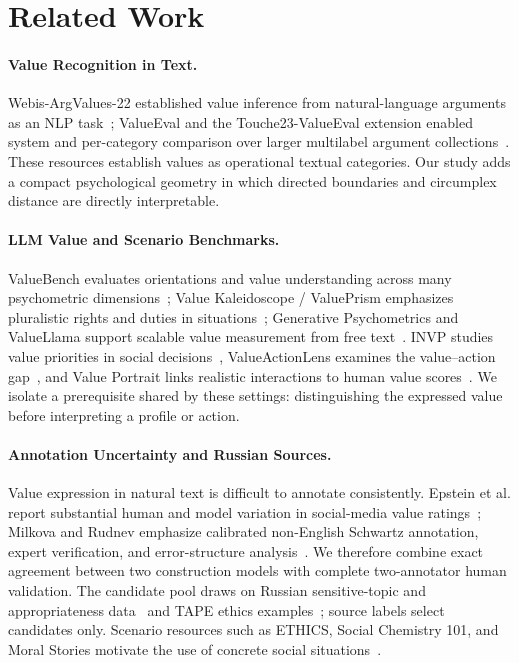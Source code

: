 \documentclass[runningheads,a4paper]{llncs}
\begin{document}
\section{Related Work}

\paragraph{Value Recognition in Text.}
Webis-ArgValues-22 established value inference from natural-language arguments as an NLP task~\cite{kiesel2022identifying}; ValueEval and the Touche23-ValueEval extension enabled system and per-category comparison over larger multilabel argument collections~\cite{kiesel2023semeval,mirzakhmedova2024touche}. These resources establish values as operational textual categories. Our study adds a compact psychological geometry in which directed boundaries and circumplex distance are directly interpretable.

\paragraph{LLM Value and Scenario Benchmarks.}
ValueBench evaluates orientations and value understanding across many psychometric dimensions~\cite{ren2024valuebench}; Value Kaleidoscope / ValuePrism emphasizes pluralistic rights and duties in situations~\cite{sorensen2024value}; Generative Psychometrics and ValueLlama support scalable value measurement from free text~\cite{ye2025measuring}. INVP studies value priorities in social decisions~\cite{liu2025invp}, ValueActionLens examines the value--action gap~\cite{shen2025valueaction}, and Value Portrait links realistic interactions to human value scores~\cite{han2025portrait}. We isolate a prerequisite shared by these settings: distinguishing the expressed value before interpreting a profile or action.

\paragraph{Annotation Uncertainty and Russian Sources.}
Value expression in natural text is difficult to annotate consistently. Epstein et al. report substantial human and model variation in social-media value ratings~\cite{epstein2025measuring}; Milkova and Rudnev emphasize calibrated non-English Schwartz annotation, expert verification, and error-structure analysis~\cite{milkova2026measuring}. We therefore combine exact agreement between two construction models with complete two-annotator human validation. The candidate pool draws on Russian sensitive-topic and appropriateness data~\cite{babakov2021inappropriate} and TAPE ethics examples~\cite{taktasheva2022tape}; source labels select candidates only. Scenario resources such as ETHICS, Social Chemistry 101, and Moral Stories motivate the use of concrete social situations~\cite{hendrycks2021ethics,forbes2020social,emelin2021moral}.
\end{document}

